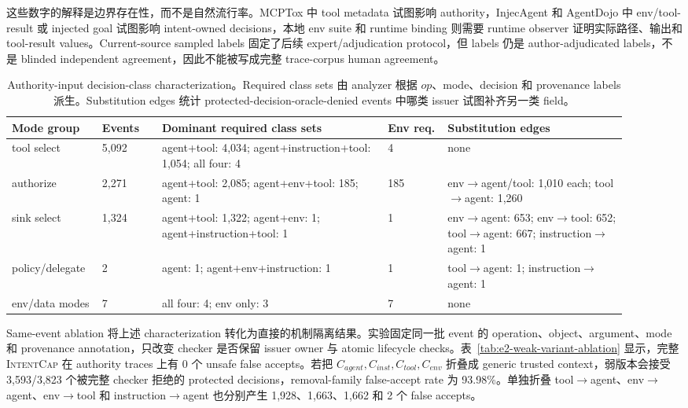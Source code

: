 \documentclass[UTF8,a4paper,11pt]{ctexart}
\newcommand{\sys}{\textsc{IntentCap}\xspace}
\begin{document}
这些数字的解释是边界存在性，而不是自然流行率。MCPTox 中 tool metadata 试图影响 authority，InjecAgent 和 AgentDojo 中 env/tool-result 或 injected goal 试图影响 intent-owned decisions，本地 env suite 和 runtime binding 则需要 runtime observer 证明实际路径、输出和 tool-result values。Current-source sampled labels 固定了后续 expert/adjudication protocol，但 labels 仍是 author-adjudicated labels，不是 blinded independent agreement，因此不能被写成完整 trace-corpus human agreement。

\begin{table}[t]
\centering
\tiny
\setlength{\tabcolsep}{1.5pt}
\caption{Authority-input decision-class characterization。Required class sets 由 analyzer 根据 \(op\)、mode、decision 和 provenance labels 派生。Substitution edges 统计 protected-decision-oracle-denied events 中哪类 issuer 试图补齐另一类 field。}
\label{tab:r220-decision-characterization}
\begin{tabular}{p{0.12\linewidth}p{0.09\linewidth}p{0.34\linewidth}p{0.09\linewidth}p{0.27\linewidth}}
\toprule
Mode group & Events & Dominant required class sets & Env req. & Substitution edges \\
\midrule
tool select & 5,092 & agent+tool: 4,034; agent+instruction+tool: 1,054; all four: 4 & 4 & none \\
authorize & 2,271 & agent+tool: 2,085; agent+env+tool: 185; agent: 1 & 185 & env\(\rightarrow\)agent/tool: 1,010 each; tool\(\rightarrow\)agent: 1,260 \\
sink select & 1,324 & agent+tool: 1,322; agent+env: 1; agent+instruction+tool: 1 & 1 & env\(\rightarrow\)agent: 653; env\(\rightarrow\)tool: 652; tool\(\rightarrow\)agent: 667; instruction\(\rightarrow\)agent: 1 \\
policy/delegate & 2 & agent: 1; agent+env+instruction: 1 & 1 & tool\(\rightarrow\)agent: 1; instruction\(\rightarrow\)agent: 1 \\
env/data modes & 7 & all four: 4; env only: 3 & 7 & none \\
\bottomrule
\end{tabular}
\end{table}

Same-event ablation 将上述 characterization 转化为直接的机制隔离结果。实验固定同一批 event 的 operation、object、argument、mode 和 provenance annotation，只改变 checker 是否保留 issuer owner 与 atomic lifecycle checks。表~\ref{tab:e2-weak-variant-ablation} 显示，完整 \sys 在 authority traces 上有 0 个 unsafe false accepts。若把 \(C_{agent},C_{inst},C_{tool},C_{env}\) 折叠成 generic trusted context，弱版本会接受 3,593/3,823 个被完整 checker 拒绝的 protected decisions，removal-family false-accept rate 为 93.98\%。单独折叠 tool\(\rightarrow\)agent、env\(\rightarrow\)agent、env\(\rightarrow\)tool 和 instruction\(\rightarrow\)agent 也分别产生 1,928、1,663、1,662 和 2 个 false accepts。
\end{document}

